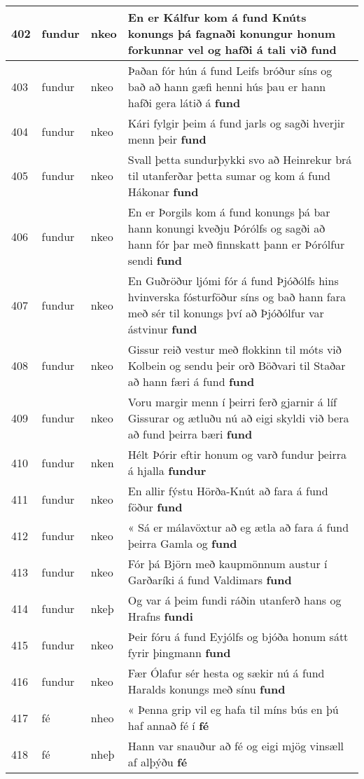 \documentclass{article}
\begin{document}
\begin{longtable}{p{1cm}|p{1cm}|p{1cm}|p{13cm}}
\hline
402&fundur&nkeo&En er Kálfur kom á fund Knúts konungs þá fagnaði konungur honum forkunnar vel og hafði á tali við \textbf{fund} \\
\hline
403&fundur&nkeo&Þaðan fór hún á fund Leifs bróður síns og bað að hann gæfi henni hús þau er hann hafði gera látið á \textbf{fund} \\
\hline
404&fundur&nkeo&Kári fylgir þeim á fund jarls og sagði hverjir menn þeir \textbf{fund} \\
\hline
405&fundur&nkeo&Svall þetta sundurþykki svo að Heinrekur brá til utanferðar þetta sumar og kom á fund Hákonar \textbf{fund} \\
\hline
406&fundur&nkeo&En er Þorgils kom á fund konungs þá bar hann konungi kveðju Þórólfs og sagði að hann fór þar með finnskatt þann er Þórólfur sendi \textbf{fund} \\
\hline
407&fundur&nkeo&En Guðröður ljómi fór á fund Þjóðólfs hins hvinverska fósturföður síns og bað hann fara með sér til konungs því að Þjóðólfur var ástvinur \textbf{fund} \\
\hline
408&fundur&nkeo&Gissur reið vestur með flokkinn til móts við Kolbein og sendu þeir orð Böðvari til Staðar að hann færi á fund \textbf{fund} \\
\hline
409&fundur&nkeo&Voru margir menn í þeirri ferð gjarnir á líf Gissurar og ætluðu nú að eigi skyldi við bera að fund þeirra bæri \textbf{fund} \\
\hline
410&fundur&nken&Hélt Þórir eftir honum og varð fundur þeirra á hjalla \textbf{fundur} \\
\hline
411&fundur&nkeo&En allir fýstu Hörða-Knút að fara á fund föður \textbf{fund} \\
\hline
412&fundur&nkeo&« Sá er málavöxtur að eg ætla að fara á fund þeirra Gamla og \textbf{fund} \\
\hline
413&fundur&nkeo&Fór þá Björn með kaupmönnum austur í Garðaríki á fund Valdimars \textbf{fund} \\
\hline
414&fundur&nkeþ&Og var á þeim fundi ráðin utanferð hans og Hrafns \textbf{fundi} \\
\hline
415&fundur&nkeo&Þeir fóru á fund Eyjólfs og bjóða honum sátt fyrir þingmann \textbf{fund} \\
\hline
416&fundur&nkeo&Fær Ólafur sér hesta og sækir nú á fund Haralds konungs með sínu \textbf{fund} \\
\hline
417&fé&nheo&« Þenna grip vil eg hafa til míns bús en þú haf annað fé í \textbf{fé} \\
\hline
418&fé&nheþ&Hann var snauður að fé og eigi mjög vinsæll af alþýðu \textbf{fé} \\

\end{longtable}
\end{document}
